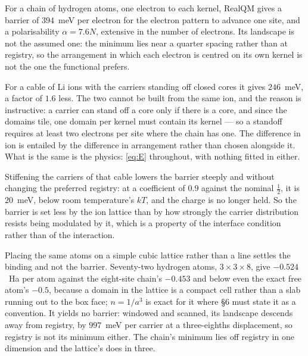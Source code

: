 \documentclass[11pt]{article}
\newcommand{\half}{\tfrac12}
\begin{document}
For a chain of hydrogen atoms, one electron to each kernel, RealQM gives a barrier of $394$~meV per
electron for the electron pattern to advance one site, and a polarisability $\alpha=7.6N$, extensive
in the number of electrons. Its landscape is not the assumed one: the minimum lies near a quarter
spacing rather than at registry, so the arrangement in which each electron is centred on its own
kernel is not the one the functional prefers.

For a cable of Li ions with the carriers standing off closed cores it gives $246$~meV, a factor of
$1.6$ less. The two cannot be built from the same ion, and the reason is instructive: a carrier can
stand off a core only if there is a core, and since the domains tile, one domain per kernel must
contain its kernel --- so a standoff requires at least two electrons per site where the chain has
one. The difference in ion is entailed by the difference in arrangement rather than chosen alongside
it. What is the same is the physics: \eqref{eq:E} throughout, with nothing fitted in either.

Stiffening the carriers of that cable lowers the barrier steeply and without changing the preferred
registry: at a coefficient of $0.9$ against the nominal $\half$, it is $20$~meV, below room temperature's
$kT$, and the charge is no longer held. So the barrier is set
less by the ion lattice than by how strongly the carrier distribution resists being modulated by it,
which is a property of the interface condition rather than of the interaction.

Placing the same atoms on a simple cubic lattice rather than a line settles the binding and not
the barrier. Seventy-two hydrogen atoms, $3\times3\times8$, give $-0.524$~Ha per atom against the
eight-site chain's $-0.453$ and below even the exact free atom's $-0.5$, because a domain in the
lattice is a compact cell rather than a slab running out to the box face; $n=1/a^3$ is exact for it
where \S6 must state it as a convention. It yields no barrier: windowed and scanned, its landscape
descends away from registry, by $997$~meV per carrier at a three-eighths displacement, so registry is
not its minimum either. The chain's minimum lies off registry in one dimension and the lattice's does
in three.
\end{document}
